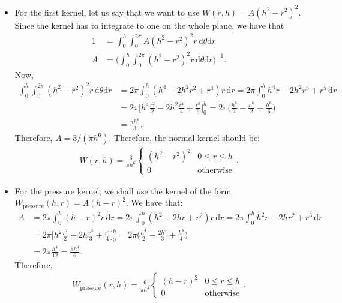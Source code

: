 \documentclass[10pt]{article}
\newcommand{\dee}{\mathrm{d}}
\begin{document}
\begin{itemize}
    \item For the first kernel, let us say that we want to use $W(r,h) = A(h^2 - r^2)^2$. Since the kernel has to integrate to one on the whole plane, we have that
    \begin{align*}
      1 &= \int_{0}^h \int_{0}^{2\pi} A (h^2 - r^2)^2 r \,\dee \theta \dee r\\
      A &= \bigg(\int_{0}^h \int_{0}^{2\pi} (h^2 - r^2)^2 r \,\dee \theta \dee r\bigg)^{-1}.
    \end{align*}
    Now,
    \begin{align*}
      \int_{0}^h \int_{0}^{2\pi} (h^2 - r^2)^2 r \,\dee \theta \dee r
      &= 2\pi \int_{0}^h (h^4 - 2h^2 r^2 + r^4) r \, \dee r
      = 2\pi \int_{0}^h h^4 r - 2h^2 r^3 + r^5  \, \dee r\\
      &= 2\pi \bigg[ h^4 \frac{r^2}{2} - 2h^2 \frac{r^4}{4} + \frac{r^6}{6} \bigg]_{0}^h
      = 2\pi \bigg( \frac{h^6}{2} - \frac{h^6}{2} + \frac{h^6}{6} \bigg)\\
      &= \frac{\pi h^6}{3}.
    \end{align*}
    Therefore, $A = 3/(\pi h^6)$. Therefore, the normal kernel should be:
    \begin{align*}
      W(r,h) = \frac{3}{\pi h^6}
      \begin{cases}
        (h^2 - r^2)^2 & 0 \leq r \leq h \\
        0 & \mathrm{otherwise}
      \end{cases}. 
    \end{align*}

    \item For the pressure kernel, we shall use the kernel of the form $W_{\mathrm{pressure}}(h,r) = A(h-r)^2$. We have that:
    \begin{align*}
      A 
      &= 2\pi \int_{0}^h (h-r)^2r \, \dee r
      = 2 \pi \int_{0}^h (h^2 - 2hr + r^2)r \, \dee r
      = 2 \pi \int_{0}^h h^2 r - 2hr^2 + r^3 \, \dee r\\
      &= 2 \pi \bigg[ h^2 \frac{r^2}{2} - 2h \frac{r^3}{3} + \frac{r^4}{4} \bigg]_0^h
      = 2\pi \bigg( \frac{h^4}{2} - \frac{2h^4}{3} + \frac{h^4}{4} \bigg)\\
      &= 2\pi \frac{h^4}{12} = \frac{\pi h^4}{6}.
    \end{align*}
    Therefore, 
    \begin{align*}
      W_{\mathrm{pressure}}(r,h) = \frac{6}{\pi h^4}
      \begin{cases}
        (h - r)^2 & 0 \leq r \leq h \\
        0 & \mathrm{otherwise}
      \end{cases}. 
    \end{align*}


\end{itemize}
\end{document}
